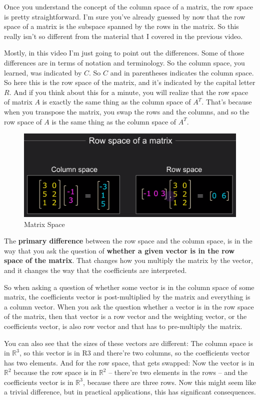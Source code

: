 \documentclass[fleqn,10pt]{olplainarticle}
\theoremstyle{definition}
\theoremstyle{remark}
\begin{document}
Once you understand the concept of the column space of a matrix, the row space is pretty straightforward. I'm sure you've already guessed by now that the row space of a matrix is the subspace spanned by the rows in the matrix. So this really isn't so different from the material that I covered in the previous video. 

Mostly, in this video I'm just going to point out the differences. Some of those differences are in terms of notation and terminology. So the column space, you learned, was indicated by $C$. So $C$ and in parentheses indicates the column space. So here this is the row space of the matrix, and it's indicated by the capital letter $R$. And if you think about this for a minute, you will realize that the row space of matrix $A$ is exactly the same thing as the column space of $A^T$. That's because when you transpose the matrix, you swap the rows and the columns, and so the row space of $A$ is the same thing as the column space of $A^T$.

\begin{figure}[ht]
	\centering
	\includegraphics[width=0.5\linewidth]{images/matrix-space-14.png}
	\caption{Matrix Space}
	\label{fig:matrix_space_14}
\end{figure}

The \textbf{primary difference} between the row space and the column space, is in the way that you ask the question of \textbf{whether a given vector is in the row space of the matrix}. That changes how you multiply the matrix by the vector, and it changes the way that the coefficients are interpreted.

So when asking a question of whether some vector is in the column space of some matrix, the coefficients vector is post-multiplied by the matrix and everything is a column vector. When you ask the question whether a vector is in the row space of the matrix, then that vector is a row vector and the weighting vector, or the coefficients vector, is also row vector and that has to pre-multiply the matrix.

You can also see that the sizes of these vectors are different: The column space is in $\mathbb{R}^3$, so this vector is in R3 and there're two columns, so the coefficients vector has two elements. And for the row space, that gets swapped: Now the vector is in $\mathbb{R}^2$ because the row space is in $\mathbb{R}^2$ -- there're two elements in the rows -- and the coefficients vector is in $\mathbb{R}^3$, because there are three rows. Now this might seem like a trivial difference, but in practical applications, this has significant consequences.
\end{document}
